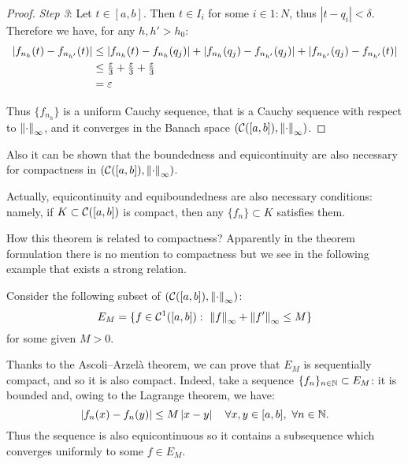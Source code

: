 \begin{proof}
	\textit{Step 3}: Let $t\in[a,b]$. Then $t \in I_i$ for some $i \in 1:N$, thus $|t-q_i|<\delta$. Therefore we have, for any $h, h'>h_0$:
	\begin{align*}
	|f_{n_h}(t)-f_{n_{h'}}(t)|
	&\leq |f_{n_h}(t)-f_{n_h}(q_j)|+|f_{n_h}(q_j)-f_{n_{h'}}(q_j)|+|f_{n_{h'}}(q_j)-f_{n_{h'}}(t)| \\
	&\le \tfrac{\varepsilon}{3}+\tfrac{\varepsilon}{3}+\tfrac{\varepsilon}{3}\\
	&= \varepsilon
	\end{align*}
	
	Thus $\{f_{n_h}\}$ is a uniform Cauchy sequence, that is a Cauchy sequence with respect to $\left\lVert\cdot\right\rVert_\infty$, and it converges in the Banach space $(\mathcal C([a,b]),\left\lVert\cdot\right\rVert_\infty)$.
\end{proof}


Also it can be shown that the boundedness and equicontinuity are also necessary for compactness in $(\mathcal C([a,b]), \left\lVert\cdot\right\rVert_\infty)$.

Actually, equicontinuity and equiboundedness are also necessary conditions: namely, if $K \subset \mathcal C([a,b])$ is compact, then any $\{f_n\}\subset K$ satisfies them.

How this theorem is related to compactness? Apparently in the theorem formulation there is no mention to compactness but we see in the following example that exists a strong relation.

\begin{exam}
	Consider the following subset of $(\mathcal C([a,b]), \left\lVert\cdot\right\rVert_\infty)$: 
	$$ 
	E_M 
	= \{
	f \in \Cc^1([a,b]) :\ 
	\norm{f}_\infty + \norm{f'}_\infty \leq M
	\}
	$$
	for some given $M > 0$.
	
	Thanks to the Ascoli--Arzelà theorem, we can prove that $E_M$ is sequentially compact, and so it is also compact. Indeed, take a sequence $\{f_n\}_{n\in \mathbb N} \subset E_M$: it is bounded and, owing to the Lagrange theorem, we have: 
	$$
	\abs{f_n(x) - f_n(y)} 
	\leq M \abs{x-y} 
	\quad \forall x,y \in [a,b], \ 
	\forall n \in \NN
	.
	$$
	Thus the sequence is also equicontinuous so it contains a subsequence which converges uniformly to some $f \in E_M$.
\end{exam}






